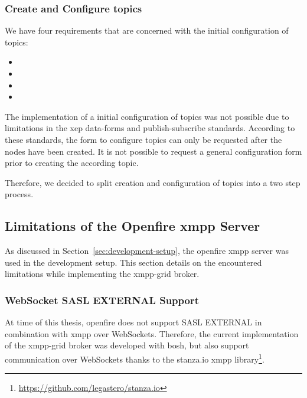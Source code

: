 \subsubsection{Create and Configure \glspl{topic}}

We have four requirements that are concerned with the initial configuration of \glspl{topic}:
\begin{itemize}
  \item {}
  \item {}
  \item {}
  \item {}
\end{itemize}

The implementation of a initial configuration of \glspl{topic} was not possible due to limitations in the \gls{xep} \gls{data-forms} and \gls{publish-subscribe} standards. According to these standards, the form to configure \glspl{topic} can only be requested after the nodes have been created. It is not possible to request a general configuration form prior to creating the according \gls{topic}.~\cite{xep-0004, xep-0060}

Therefore, we decided to split creation and configuration of \glspl{topic} into a two step process.

\subsection{Limitations of the Openfire \gls{xmpp} Server}\label{sec:limitations-of-the-openfire-xmpp-server}

As discussed in Section~\ref{sec:development-setup}, the openfire \gls{xmpp} server was used in the development setup. This section details on the encountered limitations while implementing the \gls{xmpp-grid} \gls{broker}.

\subsubsection{WebSocket SASL EXTERNAL Support}

At time of this thesis, openfire does not support SASL EXTERNAL in combination with \gls{xmpp} over WebSockets.
Therefore, the current implementation of the \gls{xmpp-grid} \gls{broker} was developed with \gls{bosh}, but also support communication over WebSockets thanks to the stanza.io \gls{xmpp} library\footnote{\url{https://github.com/legastero/stanza.io}}.

